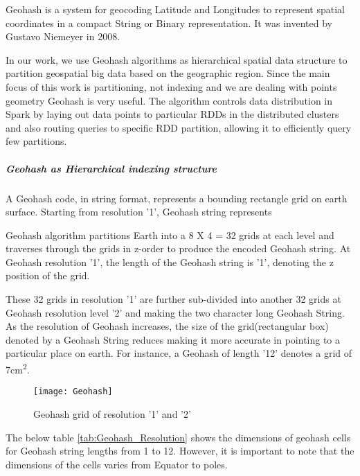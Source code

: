 \documentclass[article,type=msc,colorback,12pt,accentcolor=tud1d]{tudthesis}
\begin{document}
		   Geohash is a system for geocoding Latitude and Longitudes to represent spatial coordinates in a compact String or Binary representation. It was invented by Gustavo Niemeyer in 2008. 		   \cite{wiki:geohash} \cite{Lee:2014:ESQ:2666310.2666481, 6691586} \cite{Balkic2012}
		   
		   In our work, we use  Geohash algorithms as hierarchical spatial data structure to partition geospatial big data based on the geographic region. Since the main focus of this work is partitioning, not indexing and we are dealing with points geometry Geohash is very useful. The algorithm controls data distribution in Spark by laying out data points to particular RDDs in the distributed clusters and also routing queries to specific RDD partition, allowing it to efficiently query few partitions.
		   
		   \subparagraph{Geohash as Hierarchical indexing structure}
		   
		   A Geohash code, in string format, represents a bounding rectangle grid on earth surface. Starting from resolution '1', Geohash string represents 
		   
		   Geohash algorithm partitions Earth into a 8 X 4 = 32 grids at each level and traverses through the grids in z-order \cite{wiki:Zcurves} to produce the encoded Geohash string. At Geohash resolution '1', the length of the Geohash string is '1', denoting the z position of the grid.
		   
		   These 32 grids in resolution '1' are further sub-divided into another 32 grids at Geohash resolution level '2' and making the two character long Geohash String. As the resolution of Geohash increases, the size of the grid(rectangular box) denoted by a Geohash String reduces making it more accurate in pointing to a particular place on earth. For instance, a Geohash of length '12' denotes a grid of 7cm\textsuperscript{2}.
			
				\begin{figure}[h]
				\centering
				\texttt{[image: Geohash]}
				\caption{Geohash grid of resolution '1' and '2'}
				\label{fig:Geohash}
				\end{figure}
						   
		   \clearpage
		   The below table \ref{tab:Geohash_Resolution} shows the dimensions of geohash cells for Geohash string lengths from 1 to 12. However, it is important to note that the dimensions of the cells varies from Equator to poles. 
		   \cite{elastic_geohash}
		   
\end{document}
